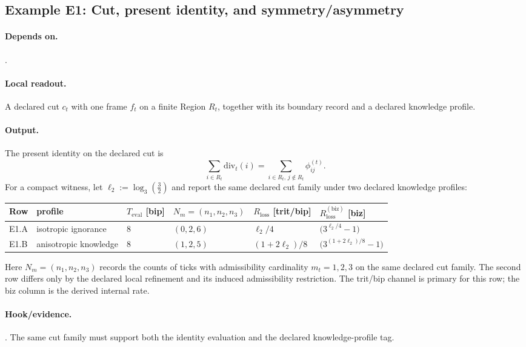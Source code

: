 \subsection{Example E1: Cut, present identity, and symmetry/asymmetry}
\paragraph{Depends on.} .
\paragraph{Local readout.} A declared cut $c_t$ with one frame $f_t$ on a finite Region $R_t$, together with its boundary record and a declared knowledge profile.
\paragraph{Output.} The present identity on the declared cut is
\[
\sum_{i\in R_t}\mathrm{div}_t(i)=\sum_{i\in R_t,\,j\notin R_t}\phi^{(t)}_{ij}.
\]
For a compact witness, let $\ell_2:=\log_3\!\left(\frac{3}{2}\right)$ and report the same declared cut family under two declared knowledge profiles:
\begin{center}
\begin{tabular}{@{}llllll@{}}
\toprule
Row & profile & $T_{\mathrm{eval}}$ [bip] & $N_m=(n_1,n_2,n_3)$ & $R_{\mathrm{loss}}$ [trit/bip] & $R_{\mathrm{loss}}^{(\mathrm{biz})}$ [biz] \\
\midrule
E1.A & isotropic ignorance & $8$ & $(0,2,6)$ & $\ell_2/4$ & $\bigl(3^{\ell_2/4}-1\bigr)$ \\
E1.B & anisotropic knowledge & $8$ & $(1,2,5)$ & $(1+2\ell_2)/8$ & $\bigl(3^{(1+2\ell_2)/8}-1\bigr)$ \\
\bottomrule
\end{tabular}
\end{center}
Here $N_m=(n_1,n_2,n_3)$ records the counts of ticks with admissibility cardinality $m_t=1,2,3$ on the same declared cut family. The second row differs only by the declared local refinement and its induced admissibility restriction. The trit/bip channel is primary for this row; the biz column is the derived internal rate.
\paragraph{Hook/evidence.} . The same cut family must support both the identity evaluation and the declared knowledge-profile tag.
